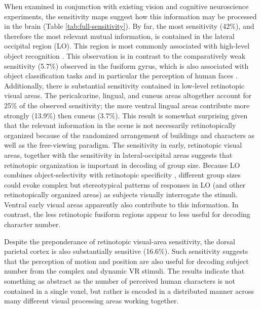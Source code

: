 \documentclass[5p,authoryear]{elsarticle}
\begin{document}
When examined in conjunction with existing vision and cognitive neuroscience experiments, the sensitivity maps suggest how this information may be processed in the brain (Table \ref{tab:full-sensitivity}).
By far, the most sensitivity (42\%), and therefore the most relevant mutual information, is contained in the lateral occipital region (LO).
This region is most commonly associated with high-level object recognition \citep{Grill-Spector2001}.
This observation is in contrast to the comparatively weak sensitivity (5.7\%) observed in the fusiform gyrus, which is also associated with object classification tasks and in particular the perception of human faces \citep{Kanwisher1997}.
Additionally, there is substantial sensitivity contained in low-level retinotopic visual areas. 
The pericalcarine, lingual, and cuneus areas altogether account for 25\% of the observed sensitivity; the more ventral lingual areas contribute more strongly (13.9\%) then cuneus (3.7\%).
This result is somewhat surprising given that the relevant information in the scene is not necessarily retinotopically organized because of the randomized arrangement of buildings and characters as well as the free-viewing paradigm.
The sensitivity in early, retinotopic visual areas, together with the sensitivity in lateral-occipital areas suggests that retinotopic organization is important in decoding of group size. 
Because LO combines object-selectivity with retinotopic specificity \citep{Sayres2008}, different group sizes could evoke complex but stereotypical patterns of responses in LO (and other retinotopically organized areas) as subjects visually interrogate the stimuli. 
Ventral early visual areas apparently also contribute to this information. 
In contrast, the less retinotopic fusiform regions \citep{Schwarzlose2008,Sayres2010} appear to less useful for decoding character number.

Despite the preponderance of retinotopic visual-area sensitivity, the dorsal parietal cortex is also substantially sensitive (16.6\%). 
Such sensitivity suggests that the perception of motion and position are also useful for decoding subject number from the complex and dynamic VR stimuli.
The results indicate that something as abstract as the number of perceived human characters is not contained in a single voxel, but rather is encoded in a distributed manner across many different visual processing areas working together.
\end{document}
